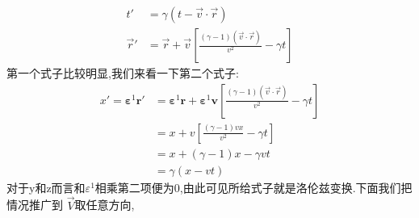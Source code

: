 \documentclass[../main.tex]{subfiles}
\begin{document}
\begin{align*}
	t'       & = \gamma(t - \vec{v}\cdot \vec{r})                                         \\
	\vec{r}' & = \vec{r} + \vec{v}[\frac{(\gamma-1)(\vec{v}\cdot \vec{r})}{v^2}-\gamma t]
\end{align*}第一个式子比较明显,我们来看一下第二个式子:
\begin{align*}
	x' = \bm{\varepsilon}^1 \bm{r}' & = \bm{\varepsilon}^1\bm{r} + \bm{\varepsilon}^1\bm{v}[\frac{(\gamma-1)(\vec{v}\cdot \vec{r})}{v^2}-\gamma t] \\
	                                & = x + v[\frac{(\gamma-1)vx}{v^2} - \gamma t]                                                                 \\
	                                & = x + (\gamma-1)x - \gamma v t                                                                               \\
	                                & = \gamma(x - vt)
\end{align*}
对于y和z而言和$\varepsilon^1$相乘第二项便为0,由此可见所给式子就是洛伦兹变换.下面我们把情况推广到 $\vec{V}$取任意方向,
\end{document}
